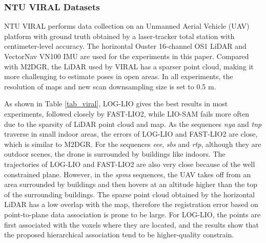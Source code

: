 \documentclass[letterpaper, 10 pt, conference]{ieeeconf}  %
\begin{document}
\subsubsection{NTU VIRAL Datasets}
NTU VIRAL performs data collection on an Unmanned Aerial Vehicle (UAV) platform with ground truth obtained by a laser-tracker total station with centimeter-level accuracy.
The horizontal Ouster 16-channel OS1 LiDAR and VectorNav VN100 IMU are used for the experiments in this paper.
Compared with M2DGR, the LiDAR used by VIRAL has a sparser point cloud, making it more challenging to estimate poses in open areas.
In all experiments, the resolution of maps and new scan downsampling size is set to 0.5 m.

As shown in Table \ref{tab_viral}, LOG-LIO gives the best results in most experiments, followed closely by FAST-LIO2, while LIO-SAM fails more often due to the sparsity of LiDAR point cloud and map.
As the sequences \emph{nya} and \emph{tnp} traverse in small indoor areas, the errors of LOG-LIO and FAST-LIO2 are close, which is similar to M2DGR.
For the sequences \emph{eee}, \emph{sbs} and \emph{rtp}, although they are outdoor scenes, the drone is surrounded by buildings like indoors.
The trajectories of LOG-LIO and FAST-LIO2 are also very close because of the well constrained plane.
However, in the \emph{spms} sequences, the UAV takes off from an area surrounded by buildings and then hovers at an altitude higher than the top of the surrounding buildings.
The sparse point cloud obtained by the horizontal LiDAR has a low overlap with the map, therefore the registration error based on point-to-plane data association is prone to be large.
For LOG-LIO, the points are first associated with the voxels where they are located, and the results show that the proposed hierarchical association tend to be higher-quality constrain.
\end{document}
